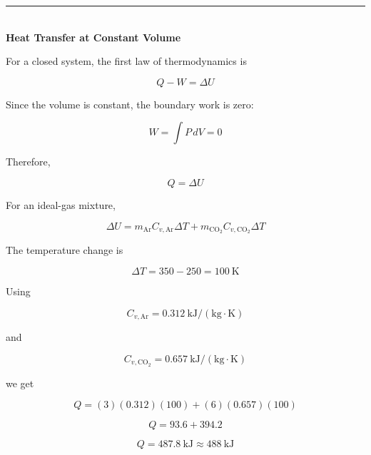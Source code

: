 \documentclass[12pt]{article}
\newcommand{\myanswer}[2]{
    \noindent{\headingfont\Large #1\space #2\par}
    \vspace{4pt}
    \hrule
    \vspace{15pt}
}
\begin{document}
\myanswer{}{Answer :}

\textbf{\\ Heat Transfer at Constant Volume}

For a closed system, the first law of thermodynamics is

\begin{equation*}
Q-W=\Delta U
\end{equation*}

Since the volume is constant, the boundary work is zero:

\begin{equation*}
W=\int P\,dV=0
\end{equation*}

Therefore,

\begin{equation*}
Q=\Delta U
\end{equation*}

For an ideal-gas mixture,

\begin{equation*}
\Delta U
=
m_{\mathrm{Ar}}C_{v,\mathrm{Ar}}\Delta T
+
m_{\mathrm{CO_2}}C_{v,\mathrm{CO_2}}\Delta T
\end{equation*}

The temperature change is

\begin{equation*}
\Delta T=350-250=100\ \mathrm{K}
\end{equation*}

Using

\begin{equation*}
C_{v,\mathrm{Ar}}=0.312\ \mathrm{kJ/(kg\cdot K)}
\end{equation*}

and

\begin{equation*}
C_{v,\mathrm{CO_2}}=0.657\ \mathrm{kJ/(kg\cdot K)}
\end{equation*}

we get

\begin{equation*}
Q
=
(3)(0.312)(100)
+
(6)(0.657)(100)
\end{equation*}

\begin{equation*}
Q=93.6+394.2
\end{equation*}

\begin{equation*}
\boxed{Q=487.8\ \mathrm{kJ}\approx488\ \mathrm{kJ}}
\end{equation*}
\end{document}
